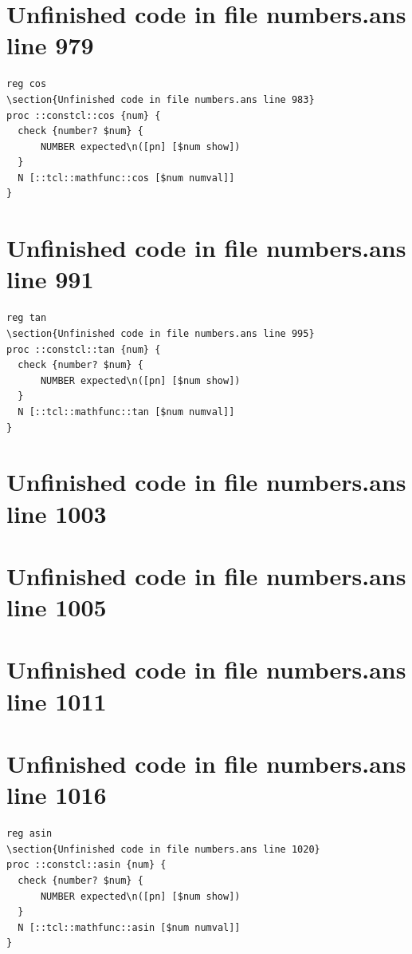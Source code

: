 \documentclass[twoside,9pt]{report}
\begin{document}
\section{Unfinished code in file numbers.ans line 979}
\begin{lstlisting}
reg cos
\section{Unfinished code in file numbers.ans line 983}
proc ::constcl::cos {num} {
  check {number? $num} {
      NUMBER expected\n([pn] [$num show])
  }
  N [::tcl::mathfunc::cos [$num numval]]
}
\end{lstlisting}
\section{Unfinished code in file numbers.ans line 991}
\begin{lstlisting}
reg tan
\section{Unfinished code in file numbers.ans line 995}
proc ::constcl::tan {num} {
  check {number? $num} {
      NUMBER expected\n([pn] [$num show])
  }
  N [::tcl::mathfunc::tan [$num numval]]
}
\end{lstlisting}
\section{Unfinished code in file numbers.ans line 1003}
\section{Unfinished code in file numbers.ans line 1005}
\section{Unfinished code in file numbers.ans line 1011}
\section{Unfinished code in file numbers.ans line 1016}
\begin{lstlisting}
reg asin
\section{Unfinished code in file numbers.ans line 1020}
proc ::constcl::asin {num} {
  check {number? $num} {
      NUMBER expected\n([pn] [$num show])
  }
  N [::tcl::mathfunc::asin [$num numval]]
}
\end{lstlisting}
\end{document}
